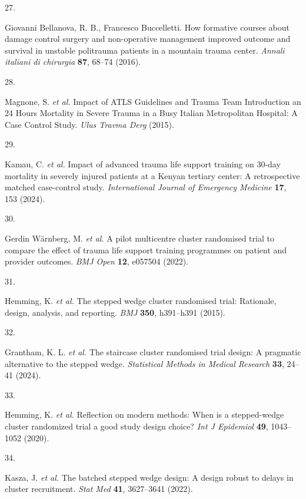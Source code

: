 \documentclass[
]{scrartcl}
\newlength{\cslhangindent}
\newlength{\csllabelwidth}
\newlength{\cslentryspacingunit} %
\newenvironment{CSLReferences}[2] %
 {%
  \setlength{\parindent}{0pt}
  \ifodd #1
  \let\oldpar\par
  \def\par{\hangindent=\cslhangindent\oldpar}
  \fi
  \setlength{\parskip}{#2\cslentryspacingunit}
 }%
 {}
\newcommand{\CSLLeftMargin}[1]{\parbox[t]{\csllabelwidth}{#1}}
\newcommand{\CSLRightInline}[1]{\parbox[t]{\linewidth - \csllabelwidth}{#1}\break}
\begin{document}
\begin{CSLReferences}{0}{0}
\leavevmode{}%
\CSLLeftMargin{27. }%
\CSLRightInline{Giovanni Bellanova, R. B., Francesco Buccelletti. How
formative courses about damage control surgery and non-operative
management improved outcome and survival in unstable politrauma patients
in a mountain trauma center. \emph{Annali italiani di chirurgia}
\textbf{87}, 68--74 (2016).}

\leavevmode{}%
\CSLLeftMargin{28. }%
\CSLRightInline{Magnone, S. \emph{et al.} Impact of {ATLS} {Guidelines}
and {Trauma} {Team} {Introduction} an 24 {Hours} {Mortality} in {Severe}
{Trauma} in a {Busy} {Italian} {Metropolitan} {Hospital}: A {Case}
{Control} {Study}. \emph{Ulus Travma Derg} (2015).}

\leavevmode{}%
\CSLLeftMargin{29. }%
\CSLRightInline{Kamau, C. \emph{et al.} Impact of advanced trauma life
support training on 30-day mortality in severely injured patients at a
{Kenyan} tertiary center: A retrospective matched case-control study.
\emph{International Journal of Emergency Medicine} \textbf{17}, 153
(2024).}

\leavevmode{}%
\CSLLeftMargin{30. }%
\CSLRightInline{Gerdin Wärnberg, M. \emph{et al.} A pilot multicentre
cluster randomised trial to compare the effect of trauma life support
training programmes on patient and provider outcomes. \emph{BMJ Open}
\textbf{12}, e057504 (2022).}

\leavevmode{}%
\CSLLeftMargin{31. }%
\CSLRightInline{Hemming, K. \emph{et al.} The stepped wedge cluster
randomised trial: Rationale, design, analysis, and reporting. \emph{BMJ}
\textbf{350}, h391--h391 (2015).}

\leavevmode{}%
\CSLLeftMargin{32. }%
\CSLRightInline{Grantham, K. L. \emph{et al.} The staircase cluster
randomised trial design: {A} pragmatic alternative to the stepped wedge.
\emph{Statistical Methods in Medical Research} \textbf{33}, 24--41
(2024).}

\leavevmode{}%
\CSLLeftMargin{33. }%
\CSLRightInline{Hemming, K. \emph{et al.} Reflection on modern methods:
When is a stepped-wedge cluster randomized trial a good study design
choice? \emph{Int J Epidemiol} \textbf{49}, 1043--1052 (2020).}

\leavevmode{}%
\CSLLeftMargin{34. }%
\CSLRightInline{Kasza, J. \emph{et al.} The batched stepped wedge
design: A design robust to delays in cluster recruitment. \emph{Stat
Med} \textbf{41}, 3627--3641 (2022).}


\end{CSLReferences}
\end{document}
